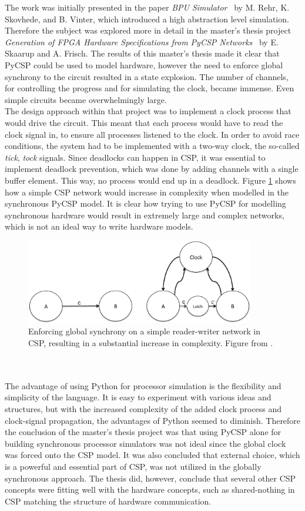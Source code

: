 The work was initially presented in the paper \textit{BPU Simulator}~\cite{Rehr2013} by M. Rehr, K. Skovhede, and B. Vinter, which introduced a high abstraction level simulation. Therefore the subject was explored more in detail in the master's thesis project \textit{Generation of FPGA Hardware
Specifications from PyCSP Networks}~\cite{Skaarup14} by E. Skaarup and A. Frisch. The results of this master's thesis made it clear that PyCSP could be used to model hardware, however the need to enforce global synchrony to the circuit resulted in a state explosion. The number of channels, for controlling the progress and for simulating the clock, became immense. Even simple circuits became overwhelmingly large.\\

The design approach within that project was to implement a clock process that would drive the circuit. This meant that each process would have to read the clock signal in, to ensure all processes listened to the clock. In order to avoid race conditions, the system had to be implemented with a two-way clock, the so-called \textit{tick}, \textit{tock} signals. Since deadlocks can happen in CSP, it was essential to implement deadlock prevention, which was done by adding channels with a single buffer element. This way, no process would end up in a deadlock. Figure \ref{fig:sme:clock_latch} shows how a simple CSP network would increase in complexity when modelled in the synchronous PyCSP model. It is clear how trying to use PyCSP for modelling synchronous hardware would result in extremely large and complex networks, which is not an ideal way to write hardware models.
\begin{figure}[h!]
\centering
\includegraphics[width=10.0cm]{figures/clocked.pdf}
\caption{Enforcing global synchrony on a simple reader-writer network in CSP, resulting in a substantial increase in complexity. Figure from \cite{Vinter2014}.}
\label{fig:sme:clock_latch}
\end{figure}
\\\\
The advantage of using Python for processor simulation is the flexibility and simplicity of the language. It is easy to experiment with various ideas and structures, but with the increased complexity of the added clock process and clock-signal propagation, the advantages of Python seemed to diminish. Therefore the conclusion of the master's thesis project was that using PyCSP alone for building synchronous processor simulators was not ideal since the global clock was forced onto the CSP model. It was also concluded that external choice, which is a powerful and essential part of CSP, was not utilized in the globally synchronous approach. The thesis did, however, conclude that several other CSP concepts were fitting well with the hardware concepts, such as shared-nothing in CSP matching the structure of hardware communication.

